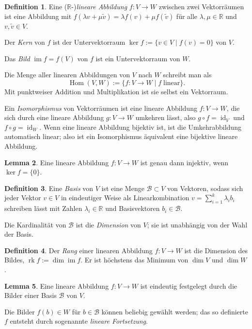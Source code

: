 \documentclass[a4paper]{scrbook}
\numberwithin{equation}{chapter}
\DeclareMathOperator{\id}{id}
\DeclareMathOperator{\Hom}{Hom}
\DeclareMathOperator{\im}{im}
\DeclareMathOperator{\rk}{rk}
\newcommand{\R}{\mathbb{R}}
\theoremstyle{definition}
\newtheorem{defn}{Definition}[section]
\newtheorem{lemma}[defn]{Lemma}
\begin{document}
\begin{defn}
	Eine ($\R$-)\emph{lineare Abbildung} $f\colon V\to W$ zwischen zwei Vektorräumen ist eine Abbildung mit $f(\lambda v + \mu \tilde v) = \lambda f(v) + \mu f(\tilde v)$ für alle $\lambda,\mu \in \R$ und $v,\tilde v \in V$.

	Der \emph{Kern} von $f$ ist der Untervektorraum $\ker f := \{v \in V \mid f(v) = 0\}$ von $V$.

	Das \emph{Bild} $\im f = f(V)$ von $f$ ist ein Untervektorraum von $W$.

	Die Menge aller linearen Abbildungen von $V$ nach $W$ schreibt man als
	\[\Hom(V,W) := \{f\colon V \to W \mid f \; \text{linear}\}.\]
	Mit punktweiser Addition und Multiplikation ist sie selbst ein Vektorraum.
	
	Ein \emph{Isomorphismus} von Vektorräumen ist eine lineare Abbildung $f\colon V\to W$, die sich durch eine lineare Abbildung $g\colon V\to W$ umkehren lässt, also $g\circ f = \id_V$ und $f\circ g = \id_W$. Wenn eine lineare Abbildung bijektiv ist, ist die Umkehrabbildung automatisch linear; also ist ein Isomorphismus äquivalent eine bijektive lineare Abbildung.
\end{defn}

\begin{lemma}
	Eine lineare Abbildung $f\colon V \to W$ ist genau dann injektiv, wenn $\ker f = \{0\}$.
\end{lemma}

\begin{defn}
	Eine \emph{Basis} von $V$ ist eine Menge $\mathcal B \subset V$ von Vektoren, sodass sich jeder Vektor $v \in V$ in eindeutiger Weise als Linearkombination $v = \sum_{i=1}^k \lambda_i b_i$ schreiben lässt mit Zahlen $\lambda_i \in \R$ und Basisvektoren $b_i \in \mathcal B$.

	Die Kardinalität von $\mathcal B$ ist die \emph{Dimension} von $V$; sie ist unabhängig von der Wahl der Basis.
\end{defn}

\begin{defn}
	Der \emph{Rang} einer linearen Abbildung $f\colon V\to W$ ist die Dimension des Bildes, $\rk f := \dim\im f$. Er ist höchstens das Minimum von $\dim V$ und $\dim W$.
\end{defn}

\begin{lemma}
	Eine lineare Abbildung $f\colon V\to W$ ist eindeutig festgelegt durch die Bilder einer Basis $\mathcal B$ von $V$.

	Die Bilder $f(b)\in W$ für $b \in \mathcal B$ können beliebig gewählt werden; das so definierte $f$ entsteht durch sogenannte \emph{lineare Fortsetzung}.
\end{lemma}
\end{document}
